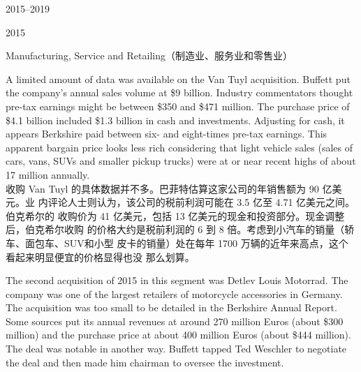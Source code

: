 \begin{chapter}{2015--2019}
\begin{section}{2015}
\begin{subsection}{Manufacturing, Service and Retailing（制造业、服务业和零售业）}
\begin{verseparallel}
  {
    A limited amount of data was available on the Van Tuyl acquisition. Buffett
    put the company’s annual sales volume at \$9 billion. Industry commentators
    thought pre-tax earnings might be between \$350 and \$471 million.
     The purchase price of \$4.1 billion included \$1.3 billion in
    cash and investments. Adjusting for cash, it appears Berkshire paid between
    six- and eight-times pre-tax earnings. This apparent bargain price looks
    less rich considering that light vehicle sales (sales of cars, vans, SUVs
    and smaller pickup trucks) were at or near recent highs of about 17 million
    annually.  \\
  }
  {
    收购 Van Tuyl 的具体数据并不多。巴菲特估算这家公司的年销售额为 90 亿美元。业
    内评论人士则认为，该公司的税前利润可能在 3.5 亿至 4.71 亿美元之间。伯克希尔的
    收购价为 41 亿美元，包括 13 亿美元的现金和投资部分。现金调整后，伯克希尔收购
    的价格大约是税前利润的 6 到 8 倍。考虑到小汽车的销量（轿车、面包车、SUV和小型
    皮卡的销量）处在每年 1700 万辆的近年来高点，这个看起来明显便宜的价格显得也没
    那么划算。
  }
\end{verseparallel}

\begin{verseparallel}
  {

    The second acquisition of 2015 in this segment was Detlev Louis Motorrad.
    The company was one of the largest retailers of motorcycle accessories in
    Germany. The acquisition was too small to be detailed in the Berkshire
    Annual Report. Some sources put its annual revenues at around 270 million
    Euros (about \$300 million) and the purchase price at about 400 million
    Euros (about \$444 million).  The
    deal was notable in another way. Buffett tapped Ted Weschler to negotiate
    the deal and then made him chairman to oversee the investment. \\

}
\end{verseparallel}
\end{subsection}
\end{section}
\end{chapter}
